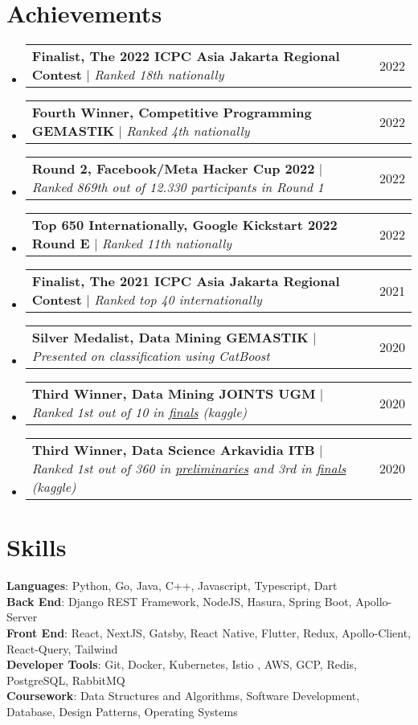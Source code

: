 \documentclass[letterpaper,11pt]{article}
\makeatletter
\newcommand{\resumeProjectHeading}[2]{
    \item
    \begin{tabular*}{\textwidth}{l@{\extracolsep{\fill}}r}
      \small#1 & #2 \\
    \end{tabular*}\vspace{-7pt}
}
\newcommand{\resumeSubHeadingListStart}{\begin{itemize}[leftmargin=0in, label={}]}
\newcommand{\resumeSubHeadingListEnd}{\end{itemize}}
\makeatother
\begin{document}
\section{Achievements}
    \resumeSubHeadingListStart
    \resumeProjectHeading
          {\textbf{Finalist, The 2022 ICPC Asia Jakarta Regional Contest}
          $|$ \emph{Ranked 18th nationally}}{2022}
    \resumeProjectHeading
          {\textbf{Fourth Winner, Competitive Programming GEMASTIK}
          $|$ \emph{Ranked 4th nationally}}{2022}
      \resumeProjectHeading
          {\textbf{Round 2, Facebook/Meta Hacker Cup 2022}
          $|$ \emph{Ranked 869th out of 12.330 participants in Round 1}}{2022}
    \resumeProjectHeading
          {\textbf{Top 650 Internationally, Google Kickstart 2022 Round E}
          $|$ \emph{Ranked 11th nationally}}{2022}
    \resumeProjectHeading
          {\textbf{Finalist, The 2021 ICPC Asia Jakarta Regional Contest}
          $|$ \emph{Ranked top 40 internationally}}{2021}
      \resumeProjectHeading
          {\textbf{Silver Medalist, Data Mining GEMASTIK}
          $|$ \emph{Presented on classification using CatBoost}}{2020}
      \resumeProjectHeading
          {\textbf{Third Winner, Data Mining JOINTS UGM}
          $|$ \emph{Ranked 1st out of 10 in \href{https://www.kaggle.com/c/final-dm-2020/leaderboard}{finals} (kaggle)}}{2020}
      \resumeProjectHeading
          {\textbf{Third Winner, Data Science Arkavidia ITB}
          $|$ \emph{Ranked 1st out of 360 in \href{https://www.kaggle.com/c/datavidia2019v2/leaderboard}{preliminaries} and 3rd in \href{https://www.kaggle.com/c/finaldatavidia2019/leaderboard}{finals} (kaggle)}}{2020}
    \resumeSubHeadingListEnd

\section{Skills}
 \begin{itemize}[leftmargin=0in, label={}]
    \small{\item{
     \textbf{Languages}{: Python, Go, Java, C++, Javascript, Typescript, Dart} \\
     \textbf{Back End}{: Django REST Framework, NodeJS, Hasura, Spring Boot, Apollo-Server} \\
     \textbf{Front End}{: React, NextJS, Gatsby, React Native, Flutter, Redux, Apollo-Client, React-Query, Tailwind} \\
     \textbf{Developer Tools}{: Git, Docker, Kubernetes, Istio , AWS, GCP, Redis, PostgreSQL, RabbitMQ} \\
     \textbf{Coursework}{: Data Structures and Algorithms, Software Development, Database, Design Patterns, Operating Systems}
    }}
 \end{itemize}


\end{document}
